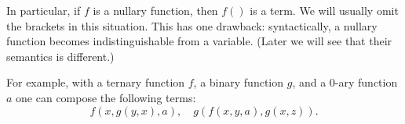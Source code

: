 

\setcounter{section}{1}
\setcounter{subsection}{1}
\setcounter{dfn}{2}

In particular, if $f$ is a nullary function, then $f()$ is a term.
We will usually omit the brackets in this situation.
This has one drawback: syntactically, a nullary function becomes indistinguishable from a variable.
(Later we will see that their semantics is different.)

For example, with a ternary function $f$, a binary function $g$, and a $0$-ary function $a$ one can compose the following terms:
\[
f(x, g(y,x), a), \quad g(f(x,y,a), g(x,z)).
\]



